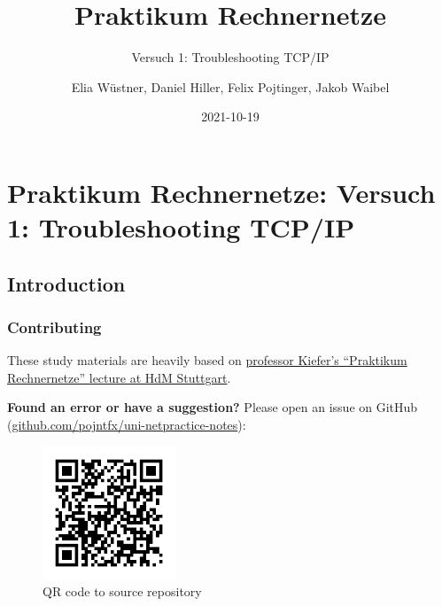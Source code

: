 \begin{titlepage}
\author{Elia Wüstner, Daniel Hiller, Felix Pojtinger, Jakob Waibel} 
\title{Praktikum Rechnernetze}
\subtitle{Versuch 1: Troubleshooting TCP/IP} 
\date{2021-10-19} 
\maketitle
\newpage
\end{titlepage}
\newpage

\hypertarget{praktikum-rechnernetze-versuch-1-troubleshooting-tcpip}{%
\section{Praktikum Rechnernetze: Versuch 1: Troubleshooting
TCP/IP}\label{praktikum-rechnernetze-versuch-1-troubleshooting-tcpip}}

\hypertarget{introduction}{%
\subsection{Introduction}\label{introduction}}

\hypertarget{contributing}{%
\subsubsection{Contributing}\label{contributing}}

These study materials are heavily based on
\href{https://www.hdm-stuttgart.de/vorlesung_detail?vorlid=5212254}{professor
Kiefer's ``Praktikum Rechnernetze'' lecture at HdM Stuttgart}.

\textbf{Found an error or have a suggestion?} Please open an issue on
GitHub
(\href{https://github.com/pojntfx/uni-netpractice-notes}{github.com/pojntfx/uni-netpractice-notes}):

\begin{figure}
\centering
\includegraphics[width=1.5625in,height=\textheight]{./static/qr.png}
\caption{QR code to source repository}
\end{figure}


